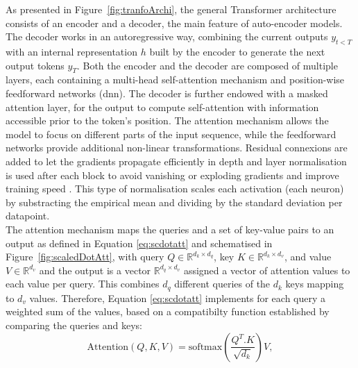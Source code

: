 As presented in Figure~\ref{fig:tranfoArchi}, the general Transformer architecture consists of an encoder and a decoder, the main feature of auto-encoder models. The decoder works in an autoregressive way, combining the current outputs $y_{t<T}$ with an internal representation $h$ built by the encoder to generate the next output tokens $y_{T}$. Both the encoder and the decoder are composed of multiple layers, each containing a multi-head self-attention mechanism and position-wise feedforward networks (\gls{dnn}). The decoder is further endowed with a masked attention layer, for the output to compute self-attention with information accessible prior to the token's position. The attention mechanism allows the model to focus on different parts of the input sequence, while the feedforward networks provide additional non-linear transformations. Residual connexions are added to let the gradients propagate efficiently in depth and layer normalisation is used after each block to avoid vanishing or exploding gradients and improve training speed \cite{ba2016layer}. This type of normalisation scales each activation (each neuron) by substracting the empirical mean and dividing by the standard deviation per datapoint. \\
The attention mechanism maps the queries and a set of key-value pairs to an output as defined in Equation \ref{eq:scdotatt} and schematised in Figure~\ref{fig:scaledDotAtt}, with query $Q \in \mathbb{R}^{d_k \times d_q}$, key $K \in \mathbb{R}^{d_k \times d_v}$, and value $V \in \mathbb{R}^{d_v}$ and the output is a vector $\mathbb{R}^{d_q \times d_v}$ assigned a vector of attention values to each value per query. This combines $d_q$ different queries of the $d_k$ keys mapping to $d_v$ values. Therefore, Equation \ref{eq:scdotatt} implements for each query a weighted sum of the values, based on a compatibilty function established by comparing the queries and keys:
\begin{equation}\label{eq:scdotatt}
    \text{Attention}(Q, K, V) = \text{softmax}\left( \frac{Q^T . K}{\sqrt{d_k}}\right) V,
\end{equation} 
